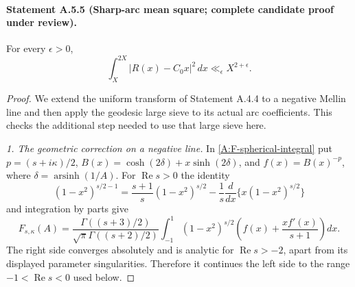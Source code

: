 \paragraph{Statement A.5.5 (Sharp-arc mean square; complete candidate proof under review).}
For every $\epsilon>0$,
\begin{equation}\label{A:sharp-mean-square}
 \int_X^{2X}|R(x)-C_0x|^2\,dx\ll_\epsilon X^{2+\epsilon}.
\end{equation}
\begin{proof}
We extend the uniform transform of Statement A.4.4 to a negative
Mellin line and then apply the geodesic large sieve to its actual
arc coefficients. This checks the additional step needed to use that
large sieve here.

\emph{1. The geometric correction on a negative line.}
In \eqref{A:F-spherical-integral} put
$p=(s+i\kappa)/2$, $B(x)=\cosh(2\delta)+x\sinh(2\delta)$,
and $f(x)=B(x)^{-p}$, where $\delta=\operatorname{arsinh}(1/A)$.
For $\operatorname{Re}s>0$ the identity
\[
 (1-x^2)^{s/2-1}
 =\frac{s+1}{s}(1-x^2)^{s/2}
       -\frac1s\frac d{dx}\{x(1-x^2)^{s/2}\}
\]
and integration by parts give
\begin{equation}\label{A:F-regularized}
 F_{s,\kappa}(A)=
 \frac{\Gamma((s+3)/2)}{\sqrt\pi\Gamma((s+2)/2)}
 \int_{-1}^1(1-x^2)^{s/2}
       \left(f(x)+\frac{x f'(x)}{s+1}\right)dx.
\end{equation}
The right side converges absolutely and is analytic for
$\operatorname{Re}s>-2$, apart from its displayed parameter
singularities. Therefore it continues the left side to the range
$-1<\operatorname{Re}s<0$ used below.


\end{proof}
